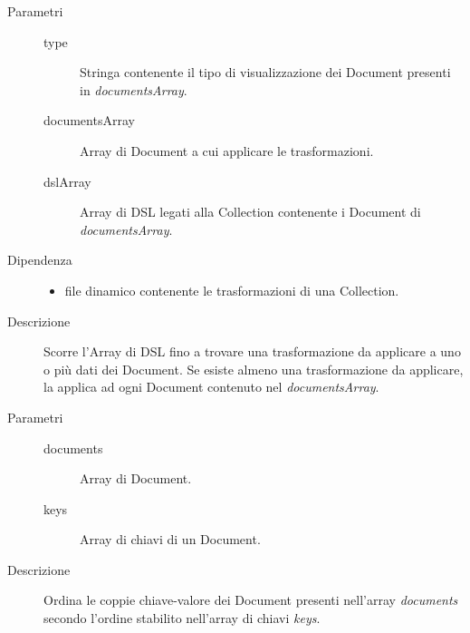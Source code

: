 \begin{description}
\begin{mldescription}
	 \hfill 
		\begin{description}
			\item[Parametri] \hfill
				\begin{description}
					\item[type] \hfill
						Stringa contenente il tipo di visualizzazione dei Document presenti in 										\textit{documentsArray}.
					\item[documentsArray] \hfill
						Array di Document a cui applicare le trasformazioni.
					\item[dslArray] \hfill
						Array di DSL legati alla Collection contenente i Document di \textit{documentsArray}.
				\end{description}
			\item[Dipendenza] \hfill
				\begin{itemize}
					\item file dinamico contenente le trasformazioni di una Collection.
				\end{itemize}
			\item[Descrizione] \hfill		
			Scorre l'Array di DSL fino a trovare una trasformazione da applicare a uno o più dati dei Document. Se esiste almeno una trasformazione da applicare, la applica ad ogni Document contenuto nel \textit{documentsArray}.							
		\end{description}
		
	 \hfill 
		\begin{description}
			\item[Parametri] \hfill
				\begin{description}
					\item[documents] \hfill
					Array di Document.
					\item[keys] \hfill
					Array di chiavi di un Document.
				\end{description}
			\item[Descrizione] \hfill
			Ordina le coppie chiave-valore dei Document presenti nell'array \textit{documents} secondo 
			l'ordine stabilito nell'array di chiavi \textit{keys}.
		\end{description}			
	

\end{mldescription}
\end{description}
